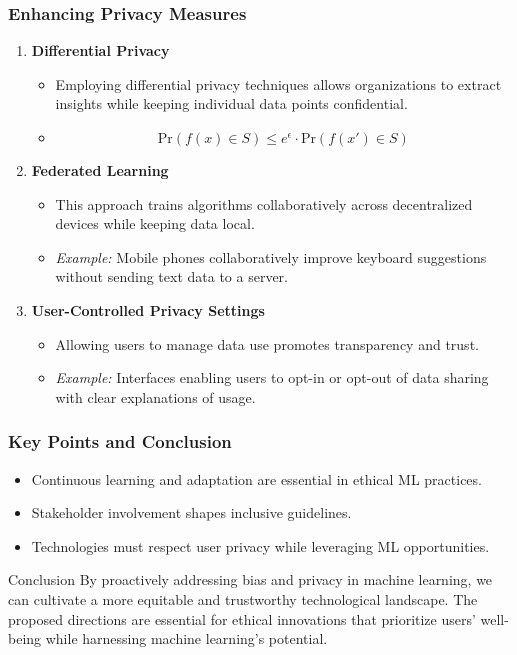 \documentclass[aspectratio=169]{beamer}
\begin{document}
\begin{frame}[fragile]
    \frametitle{Enhancing Privacy Measures}
    \begin{enumerate}
        \item \textbf{Differential Privacy}
            \begin{itemize}
                \item Employing differential privacy techniques allows organizations to extract insights while keeping individual data points confidential.
                \item \begin{equation}
                    \text{Pr}(f(x) \in S) \leq e^{\epsilon} \cdot \text{Pr}(f(x') \in S)
                \end{equation}
            \end{itemize}
        
        \item \textbf{Federated Learning}
            \begin{itemize}
                \item This approach trains algorithms collaboratively across decentralized devices while keeping data local.
                \item \textit{Example:} Mobile phones collaboratively improve keyboard suggestions without sending text data to a server.
            \end{itemize}
        
        \item \textbf{User-Controlled Privacy Settings}
            \begin{itemize}
                \item Allowing users to manage data use promotes transparency and trust.
                \item \textit{Example:} Interfaces enabling users to opt-in or opt-out of data sharing with clear explanations of usage.
            \end{itemize}
    \end{enumerate}
\end{frame}

\begin{frame}[fragile]
    \frametitle{Key Points and Conclusion}
    \begin{itemize}
        \item Continuous learning and adaptation are essential in ethical ML practices.
        \item Stakeholder involvement shapes inclusive guidelines.
        \item Technologies must respect user privacy while leveraging ML opportunities.
    \end{itemize}
    
    \begin{block}{Conclusion}
        By proactively addressing bias and privacy in machine learning, we can cultivate a more equitable and trustworthy technological landscape. The proposed directions are essential for ethical innovations that prioritize users' well-being while harnessing machine learning's potential.
    \end{block}
\end{frame}
\end{document}
